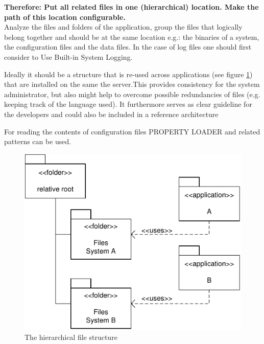 \begin{center}
   
\end{center}

\textbf{Therefore: Put all related files in one (hierarchical) location. Make the path of this location configurable.}\\

Analyze the files and folders of the application, group the files that logically belong together and should be at the same location e.g.: the binaries of a system, the configuration files and the data files. In the case of log files one should first consider to {\sc Use Built-in System Logging}.

Ideally it should be a structure that is re-used across applications (see figure \ref{fig:singleFileLocationDiagram-01}) that are installed on the same the server.This provides consistency for the system administrator, but also might help to overcome possible redundancies of files (e.g. keeping track of the language used). It furthermore serves as clear guideline for the developers and could also be included in a reference architecture

For reading the contents of configuration files PROPERTY LOADER and related patterns \cite{Wellhausen2010} can be used. 

\begin{figure}[h]
\centering
\includegraphics{patterns/singleFileLocationDiagram-01.pdf}
\caption{The hierarchical file structure}
\label{fig:singleFileLocationDiagram-01}
\end{figure}


